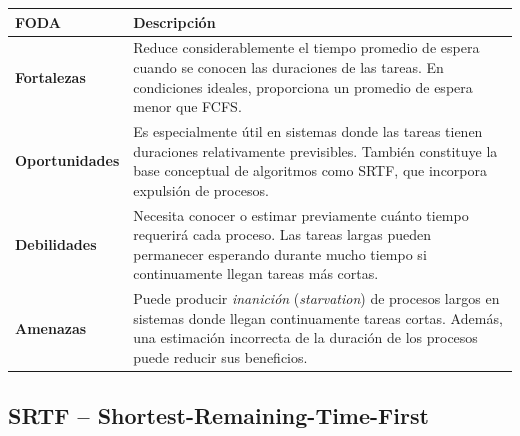 \begin{center}
\begin{tabular}{|p{}|p{}|}
\hline
\textbf{FODA} & \textbf{Descripción} \\ \hline

\textbf{Fortalezas} &
Reduce considerablemente el tiempo promedio de espera cuando se conocen las duraciones de las tareas. En condiciones ideales, proporciona un promedio de espera menor que FCFS. \\ \hline

\textbf{Oportunidades} &
Es especialmente útil en sistemas donde las tareas tienen duraciones relativamente previsibles. También constituye la base conceptual de algoritmos como SRTF, que incorpora expulsión de procesos. \\ \hline

\textbf{Debilidades} &
Necesita conocer o estimar previamente cuánto tiempo requerirá cada proceso. Las tareas largas pueden permanecer esperando durante mucho tiempo si continuamente llegan tareas más cortas. \\ \hline

\textbf{Amenazas} &
Puede producir \textit{inanición} (\textit{starvation}) de procesos largos en sistemas donde llegan continuamente tareas cortas. Además, una estimación incorrecta de la duración de los procesos puede reducir sus beneficios. \\ \hline

\end{tabular}
\end{center}

\subsection{SRTF -- Shortest-Remaining-Time-First}

